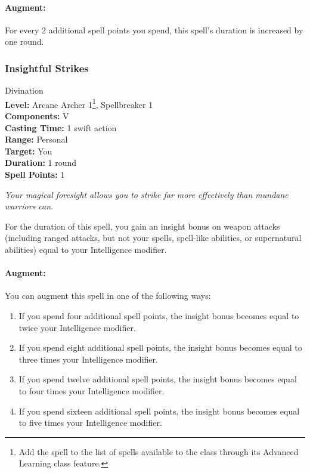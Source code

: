 \paragraph{Augment:} For every 2 additional spell points you spend, this spell's duration is increased by one round.
\subsubsection{Insightful Strikes}
\label{Spell:InsightfulStrikes}
Divination
\\ \textbf{Level:} Arcane Archer 1\footnote{Add the spell to the list of spells available to the class through its Advanced Learning class feature.}, Spellbreaker 1
\\ \textbf{Components:} V
\\ \textbf{Casting Time:} 1 swift action
\\ \textbf{Range:} Personal
\\ \textbf{Target:} You
\\ \textbf{Duration:} 1 round
\\ \textbf{Spell Points:} 1

\emph{Your magical foresight allows you to strike far more effectively than mundane warriors can.}

For the duration of this spell, you gain an insight bonus on weapon attacks (including ranged attacks, but not your spells, spell-like abilities, or supernatural abilities) equal to your Intelligence modifier.

\paragraph{Augment:} You can augment this spell in one of the following ways:
\begin{enumerate}
 \item If you spend four additional spell points, the insight bonus becomes equal to twice your Intelligence modifier.
 \item If you spend eight additional spell points, the insight bonus becomes equal to three times your Intelligence modifier.
 \item If you spend twelve additional spell points, the insight bonus becomes equal to four times your Intelligence modifier.
 \item If you spend sixteen additional spell points, the insight bonus becomes equal to five times your Intelligence modifier.
\end{enumerate}

